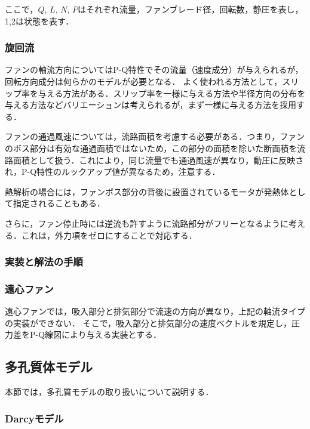 \begin{enumerate}
ここで，$Q,\,L,\,N,\,P$はそれぞれ流量，ファンブレード径，回転数，静圧を表し，1,2は状態を表す．

\end{enumerate}


%
\subsubsection{旋回流}
ファンの軸流方向についてはP-Q特性でその流量（速度成分）が与えられるが，回転方向成分は何らかのモデルが必要となる．
よく使われる方法として，スリップ率を与える方法がある．スリップ率を一様に与える方法や半径方向の分布を与える方法などバリエーションは考えられるが，まず一様に与える方法を採用する．

ファンの通過風速については，流路面積を考慮する必要がある．つまり，ファンのボス部分は有効な通過面積ではないため，この部分の面積を除いた断面積を流路面積として扱う．これにより，同じ流量でも通過風速が異なり，動圧に反映され，P-Q特性のルックアップ値が異なるため，注意する．

熱解析の場合には，ファンボス部分の背後に設置されているモータが発熱体として指定されることもある．

さらに，ファン停止時には逆流も許すように流路部分がフリーとなるように考える．これは，外力項をゼロにすることで対応する．




%
\subsubsection{実装と解法の手順}


%
\subsubsection{遠心ファン}
遠心ファンでは，吸入部分と排気部分で流速の方向が異なり，上記の軸流タイプの実装ができない．
そこで，吸入部分と排気部分の速度ベクトルを規定し，圧力差をP-Q線図により与える実装とする．




\pagebreak
%
\subsection{多孔質体モデル}
\label{sec:porous model}
本節では，多孔質モデルの取り扱いについて説明する．

\subsubsection{Darcyモデル}

